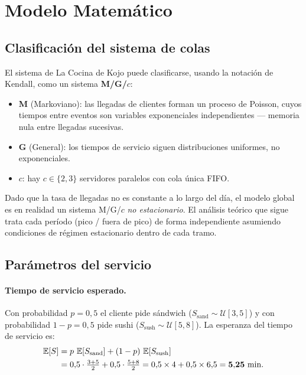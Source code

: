 \section{Modelo Matemático}

\subsection{Clasificación del sistema de colas}

El sistema de La Cocina de Kojo puede clasificarse, usando la notación de
Kendall, como un sistema \textbf{M/G/$c$}:
\begin{itemize}
  \item \textbf{M} (Markoviano): las llegadas de clientes forman un proceso
    de Poisson, cuyos tiempos entre eventos son variables exponenciales
    independientes --- memoria nula entre llegadas sucesivas.
  \item \textbf{G} (General): los tiempos de servicio siguen distribuciones
    uniformes, no exponenciales.
  \item \textbf{$c$}: hay $c \in \{2, 3\}$ servidores paralelos con cola
    única FIFO.
\end{itemize}

Dado que la tasa de llegadas no es constante a lo largo del día, el modelo
global es en realidad un sistema M/G/$c$ \emph{no estacionario}.
El análisis teórico que sigue trata cada período (pico / fuera de pico) de
forma independiente asumiendo condiciones de régimen estacionario dentro de
cada tramo.

\subsection{Parámetros del servicio}

\paragraph{Tiempo de servicio esperado.}
Con probabilidad $p = 0{,}5$ el cliente pide sándwich
($S_{\text{sand}} \sim \mathcal{U}[3,5]$) y con probabilidad $1-p = 0{,}5$
pide sushi ($S_{\text{sush}} \sim \mathcal{U}[5,8]$).
La esperanza del tiempo de servicio es:
\begin{align}
  \operatorname{\mathbb{E}}[S] &= p\,\operatorname{\mathbb{E}}[S_{\text{sand}}] + (1-p)\,\operatorname{\mathbb{E}}[S_{\text{sush}}] \nonumber \\
         &= 0{,}5 \cdot \tfrac{3+5}{2} + 0{,}5 \cdot \tfrac{5+8}{2}
          = 0{,}5 \times 4 + 0{,}5 \times 6{,}5
          = \mathbf{5{,}25} \text{ min.}
  \label{eq:ES}
\end{align}

